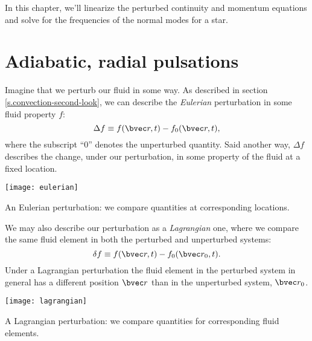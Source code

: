 
In this chapter, we'll linearize the perturbed continuity and momentum equations and solve for the frequencies of the normal modes for a star.

\section{Adiabatic, radial pulsations}\label{s.adiabatic-radial}
Imagine that we perturb our fluid in some way.
As described in section \ref{s.convection-second-look}, we can describe the \emph{Eulerian} perturbation in some fluid property $f$:
\begin{equation}
  \Delta f \equiv f(\vr,t)-f_{0}(\vr,t),
\end{equation}
where the subscript ``0'' denotes the unperturbed quantity. Said another way, $\Delta f$ describes the change, under our perturbation, in some property of the fluid at a fixed location.
\begin{marginfigure}[-12\baselineskip]
\texttt{[image: eulerian]}
\caption{\label{f.eulerian-grid} An Eulerian perturbation: we compare quantities at corresponding locations.}
\end{marginfigure}

We may also describe our perturbation as a \emph{Lagrangian} one, where we compare the same fluid element in both the perturbed and unperturbed systems:
\begin{equation}
 \delta f \equiv f(\vr,t) - f_{0}(\vr_{0},t).
\end{equation}
Under a Lagrangian perturbation the fluid element in the perturbed system in general has a different position $\vr$ than in the unperturbed system, $\vr_{0}$.
\begin{marginfigure}
\texttt{[image: lagrangian]}
\caption{\label{f.lagrangian-grid} A Lagrangian perturbation: we compare quantities for corresponding fluid elements.}
\end{marginfigure}

